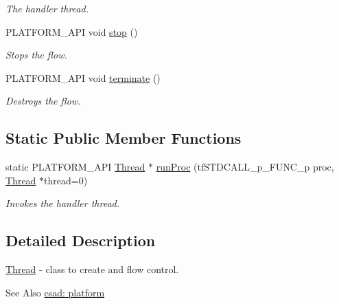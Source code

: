 \begin{DoxyCompactItemize}
\begin{DoxyCompactList}\small\item\em The handler thread. \end{DoxyCompactList}\item 
\hypertarget{classcsad_1_1_thread_a090bb84933f4c499798497a86f59f7f3}{P\-L\-A\-T\-F\-O\-R\-M\-\_\-\-A\-P\-I void \hyperlink{classcsad_1_1_thread_a090bb84933f4c499798497a86f59f7f3}{stop} ()}\label{classcsad_1_1_thread_a090bb84933f4c499798497a86f59f7f3}

\begin{DoxyCompactList}\small\item\em Stops the flow. \end{DoxyCompactList}\item 
\hypertarget{classcsad_1_1_thread_a305482b0fd2bbc6c536ee0b9861a591d}{P\-L\-A\-T\-F\-O\-R\-M\-\_\-\-A\-P\-I void \hyperlink{classcsad_1_1_thread_a305482b0fd2bbc6c536ee0b9861a591d}{terminate} ()}\label{classcsad_1_1_thread_a305482b0fd2bbc6c536ee0b9861a591d}

\begin{DoxyCompactList}\small\item\em Destroys the flow. \end{DoxyCompactList}\end{DoxyCompactItemize}
\subsection*{Static Public Member Functions}
\begin{DoxyCompactItemize}
\item 
\hypertarget{classcsad_1_1_thread_ad52f254f4bdd528d5303d7918a2bc577}{static P\-L\-A\-T\-F\-O\-R\-M\-\_\-\-A\-P\-I \hyperlink{classcsad_1_1_thread}{Thread} $\ast$ \hyperlink{classcsad_1_1_thread_ad52f254f4bdd528d5303d7918a2bc577}{run\-Proc} (tf\-S\-T\-D\-C\-A\-L\-L\-\_\-p\-\_\-\-F\-U\-N\-C\-\_\-p proc, \hyperlink{classcsad_1_1_thread}{Thread} $\ast$thread=0)}\label{classcsad_1_1_thread_ad52f254f4bdd528d5303d7918a2bc577}

\begin{DoxyCompactList}\small\item\em Invokes the handler thread. \end{DoxyCompactList}\end{DoxyCompactItemize}


\subsection{Detailed Description}
\hyperlink{classcsad_1_1_thread}{Thread} -\/ class to create and flow control. 

\begin{DoxySeeAlso}{See Also}
\hyperlink{group__platform}{csad\-: platform} 
\end{DoxySeeAlso}
